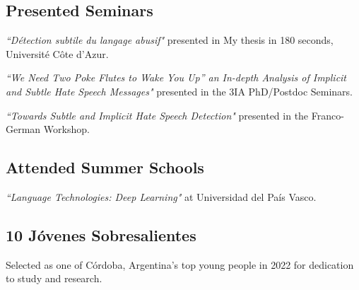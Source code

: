\documentclass[a4paper]{MagicalCV}
\begin{document}
\begin{minipage}[t]{0.36\textwidth}
\subsection{Presented Seminars}
\textit{``Détection subtile du langage abusif"} presented in My thesis in 180 seconds, Université Côte d’Azur.
\sectionsep

\textit{``We Need Two Poke Flutes to Wake You Up'' an In-depth Analysis of Implicit and Subtle Hate Speech Messages"} presented in the 3IA PhD/Postdoc Seminars. 
\sectionsep

\textit{``Towards Subtle and Implicit Hate Speech Detection"} presented in the Franco-German Workshop.
\sectionsep

\subsection{Attended Summer Schools}
\textit{``Language Technologies: Deep Learning"} at Universidad del País Vasco. 




\subsection{10 Jóvenes Sobresalientes}
\vspace{\topsep} %
\href{https://bolsacba.com.ar/certamen/ganadores.php}{\faLink} Selected as one of Córdoba, Argentina's top young people in 2022 for dedication to study and research.
\sectionsep


\end{minipage}
\end{document}

